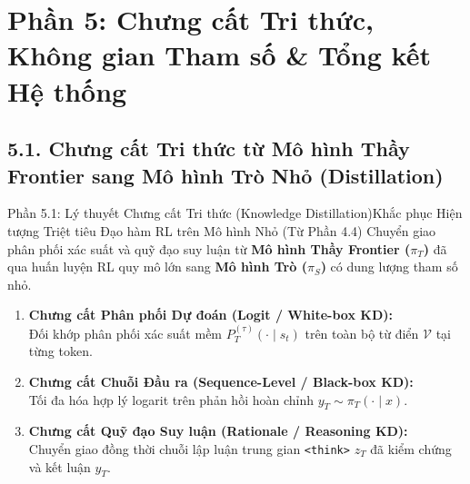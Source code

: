 \section{Phần 5: Chưng cất Tri thức, Không gian Tham số \& Tổng kết Hệ thống}

\subsection{5.1. Chưng cất Tri thức từ Mô hình Thầy Frontier sang Mô hình Trò Nhỏ (Distillation)}

\begin{frame}{Phần 5.1: Lý thuyết Chưng cất Tri thức (Knowledge Distillation)}{Khắc phục Hiện tượng Triệt tiêu Đạo hàm RL trên Mô hình Nhỏ (Từ Phần 4.4)}
  \small
  Chuyển giao phân phối xác suất và quỹ đạo suy luận từ \textbf{Mô hình Thầy Frontier ($\pi_T$)} đã qua huấn luyện RL quy mô lớn sang \textbf{Mô hình Trò ($\pi_S$)} có dung lượng tham số nhỏ.

  \vspace{0.10cm}
  \small
  \begin{enumerate}\setlength{\itemsep}{5pt}
    \item \textbf{Chưng cất Phân phối Dự đoán (Logit / White-box KD):}\\
      \footnotesize Đối khớp phân phối xác suất mềm $P_T^{(\tau)}(\cdot \mid s_t)$ trên toàn bộ từ điển $\mathcal{V}$ tại từng token.
    \item \textbf{Chưng cất Chuỗi Đầu ra (Sequence-Level / Black-box KD):}\\
      \footnotesize Tối đa hóa hợp lý logarit trên phản hồi hoàn chỉnh $y_T \sim \pi_T(\cdot \mid x)$.
    \item \textbf{Chưng cất Quỹ đạo Suy luận (Rationale / Reasoning KD):}\\
      \footnotesize Chuyển giao đồng thời chuỗi lập luận trung gian \texttt{<think>} $z_T$ đã kiểm chứng và kết luận $y_T$.
  \end{enumerate}
\end{frame}

